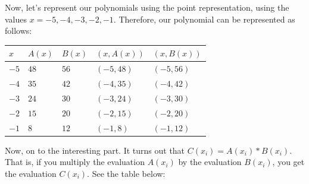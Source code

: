 \documentclass[11pt]{article}
\begin{document}
Now, let's represent our polynomials using the point representation,
using the values \(x = -5, -4, -3, -2, -1\). Therefore, our polynomial
can be represented as follows:

{\def\LTcaptype{none} %
\begin{longtable}[]{@{}lllll@{}}
\toprule\noalign{}
\(x\) & \(A(x)\) & \(B(x)\) & \((x, A(x))\) & \((x, B(x))\) \\
\midrule\noalign{}
\endhead
\bottomrule\noalign{}
\endlastfoot
\(-5\) & \(48\) & \(56\) & \((-5, 48)\) & \((-5, 56)\) \\
\(-4\) & \(35\) & \(42\) & \((-4, 35)\) & \((-4, 42)\) \\
\(-3\) & \(24\) & \(30\) & \((-3, 24)\) & \((-3, 30)\) \\
\(-2\) & \(15\) & \(20\) & \((-2, 15)\) & \((-2, 20)\) \\
\(-1\) & \(8\) & \(12\) & \((-1, 8)\) & \((-1, 12)\) \\
\end{longtable}
}

Now, on to the interesting part. It turns out that
\(C(x_i) =A(x_i) \ast B(x_i)\). That is, if you multiply the evaluation
\(A(x_i)\) by the evaluation \(B(x_i)\), you get the evaluation
\(C(x_i)\). See the table below:
\end{document}
